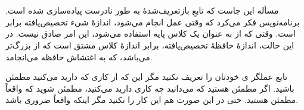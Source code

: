 \section{}
\paragraph{}\label{answer:56}
 مسأله این جاست که تابعِ بازتعریف‌شدهٔ  به طور نادرست پیاده‌سازی شده است. برنامه‌نویس فکر می‌کرد که وقتی عمل  انجام می‌شود، اندازهٔ شیء تخصیص‌یافته برابر  است. وقتی که از  به عنوان یک کلاس پایه استفاده می‌شود، این امر صادق نیست. در این حالت، اندازهٔ حافظهٔ تخصیص‌یافته، برابر اندازهٔ کلاس مشتق  است که از  بزرگ‌تر می‌باشد، که به اغتشاش حافظه می‌انجامد.

تابع عملگر ی خودتان را تعریف نکنید مگر این که از کاری که دارید می‌کنید مطمئن باشید. اگر مطمئن هستید که می‌دانید چه کاری دارید می‌کنید، مطمئن شوید که واقعاً مطمئن هستید. حتی در این صورت هم این کار را نکنید مگر اینکه واقعاً ضروری باشد.